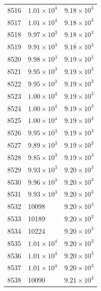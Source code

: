 \begin{table}[H]
\begin{tabular}{lll}
8516 & $\displaystyle 1.01 \times 10^{4}$ & $\displaystyle 9.18 \times 10^{3}$ \\
8517 & $\displaystyle 1.01 \times 10^{4}$ & $\displaystyle 9.18 \times 10^{3}$ \\
8518 & $\displaystyle 9.97 \times 10^{3}$ & $\displaystyle 9.18 \times 10^{3}$ \\
8519 & $\displaystyle 9.91 \times 10^{3}$ & $\displaystyle 9.18 \times 10^{3}$ \\
8520 & $\displaystyle 9.98 \times 10^{3}$ & $\displaystyle 9.19 \times 10^{3}$ \\
8521 & $\displaystyle 9.95 \times 10^{3}$ & $\displaystyle 9.19 \times 10^{3}$ \\
8522 & $\displaystyle 9.95 \times 10^{3}$ & $\displaystyle 9.19 \times 10^{3}$ \\
8523 & $\displaystyle 1.00 \times 10^{4}$ & $\displaystyle 9.19 \times 10^{3}$ \\
8524 & $\displaystyle 1.00 \times 10^{4}$ & $\displaystyle 9.19 \times 10^{3}$ \\
8525 & $\displaystyle 1.00 \times 10^{4}$ & $\displaystyle 9.19 \times 10^{3}$ \\
8526 & $\displaystyle 9.95 \times 10^{3}$ & $\displaystyle 9.19 \times 10^{3}$ \\
8527 & $\displaystyle 9.89 \times 10^{3}$ & $\displaystyle 9.19 \times 10^{3}$ \\
8528 & $\displaystyle 9.85 \times 10^{3}$ & $\displaystyle 9.19 \times 10^{3}$ \\
8529 & $\displaystyle 9.93 \times 10^{3}$ & $\displaystyle 9.20 \times 10^{3}$ \\
8530 & $\displaystyle 9.96 \times 10^{3}$ & $\displaystyle 9.20 \times 10^{3}$ \\
8531 & $\displaystyle 9.93 \times 10^{3}$ & $\displaystyle 9.20 \times 10^{3}$ \\
8532 & 10098 & $\displaystyle 9.20 \times 10^{3}$ \\
8533 & 10189 & $\displaystyle 9.20 \times 10^{3}$ \\
8534 & 10224 & $\displaystyle 9.20 \times 10^{3}$ \\
8535 & $\displaystyle 1.01 \times 10^{4}$ & $\displaystyle 9.20 \times 10^{3}$ \\
8536 & $\displaystyle 1.01 \times 10^{4}$ & $\displaystyle 9.20 \times 10^{3}$ \\
8537 & $\displaystyle 1.01 \times 10^{4}$ & $\displaystyle 9.20 \times 10^{3}$ \\
8538 & 10090 & $\displaystyle 9.21 \times 10^{3}$ \\

\end{tabular}
\end{table}
